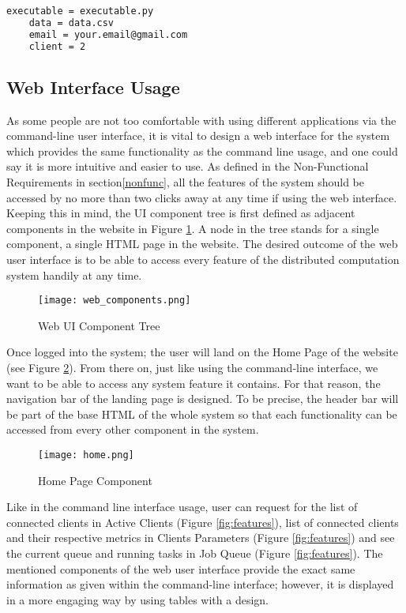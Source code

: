 \documentclass[10pt]{report}
\begin{document}
\begin{lstlisting}[language=sh]
    executable = executable.py
    data = data.csv
    email = your.email@gmail.com
    client = 2
\end{lstlisting}

\subsection{Web Interface Usage}

As some people are not too comfortable with using different applications via the command-line user interface, it is vital to design a web interface for the system which provides the same functionality as the command line usage, and one could say it is more intuitive and easier to use. As defined in the Non-Functional Requirements in section\ref{nonfunc}, all the features of the system should be accessed by no more than two clicks away at any time if using the web interface. Keeping this in mind, the UI component tree is first defined as adjacent components in the website in Figure \ref{fig:webcomp}. A node in the tree stands for a single component, a single HTML page in the website. The desired outcome of the web user interface is to be able to access every feature of the distributed computation system handily at any time.

\begin{figure}[htp]
    \centering
    \texttt{[image: web\_components.png]}
    \caption{Web UI Component Tree}
    \label{fig:webcomp}
\end{figure}

\noindent Once logged into the system; the user will land on the Home Page of the website (see Figure \ref{fig:home}). From there on, just like using the command-line interface, we want to be able to access any system feature it contains. For that reason, the navigation bar of the landing page is designed. To be precise, the header bar will be part of the base HTML of the whole system so that each functionality can be accessed from every other component in the system.
\newline

\begin{figure}[htp]
    \centering
    \texttt{[image: home.png]}
    \caption{Home Page Component}
    \label{fig:home}
\end{figure}

Like in the command line interface usage, user can request for the list of connected clients in Active Clients (Figure \ref{fig:features}), list of connected clients and their respective metrics in Clients Parameters (Figure \ref{fig:features}) and see the current queue and running tasks in Job Queue (Figure \ref{fig:features}). The mentioned components of the web user interface provide the exact same information as given within the command-line interface; however, it is displayed in a more engaging way by using tables with a design.
\newline
\end{document}
